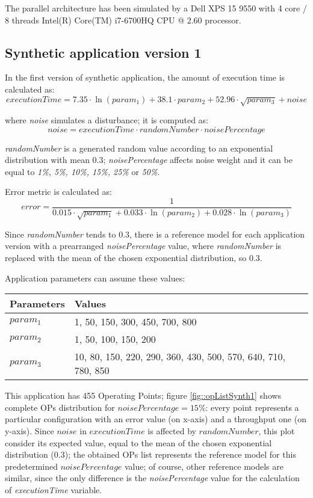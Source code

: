 The parallel architecture has been simulated by a Dell XPS 15 9550 with 4 core / 8 threads Intel(R) Core(TM) i7-6700HQ CPU @ 2.60 processor.


\subsection{Synthetic application version 1}

In the first version of synthetic application, the amount of execution time is calculated as:
\[
executionTime = 7.35 \cdot \ln{(param_1)} + 38.1 \cdot param_2 + 52.96 \cdot \sqrt{param_3} + noise
\]

where \textit{noise} simulates a disturbance; it is computed as:
\[
noise = executionTime \cdot randomNumber \cdot noisePercentage
\]

\textit{randomNumber} is a generated random value according to an exponential distribution with mean 0.3; \textit{noisePercentage} affects noise weight and it can be equal to \textit{1\%, 5\%, 10\%, 15\%, 25\%} or \textit{50\%}.

Error metric is calculated as:
\[
error = \dfrac{1}{0.015 \cdot \sqrt{param_1} + 0.033 \cdot \ln{(param_2)} + 0.028 \cdot \ln{(param_3)}}
\]

Since \textit{randomNumber} tends to 0.3, there is a reference model for each application version with a prearranged \textit{noisePercentage} value, where \textit{randomNumber} is replaced with the mean of the chosen exponential distribution, so 0.3.

Application parameters can assume these values:

\begin{center}

    \begin{tabular}{ll}
    
        \toprule
        Parameters & Values \\
        \midrule
        $param_1$ & 1, 50, 150, 300, 450, 700, 800 \\
        $param_2$ & 1, 50, 100, 150, 200 \\
        $param_3$ & 10, 80, 150, 220, 290, 360, 430, 500, 570, 640, 710, 780, 850 \\
        \bottomrule 
    
    \end{tabular}

\end{center}

This application has 455 Operating Points; figure \ref{fig::opListSynth1} shows complete OPs distribution for $noisePercentage = 15\%$: every point represents a particular configuration with an error value (on x-axis) and a throughput one (on y-axis). Since $noise$ in $executionTime$ is affected by $randomNumber$, this plot consider its expected value, equal to the mean of the chosen exponential distribution (0.3); the obtained OPs list represents the reference model for this predetermined $noisePercentage$ value; of course, other reference models are similar, since the only difference is the \textit{noisePercentage} value for the calculation of \textit{executionTime} variable.

